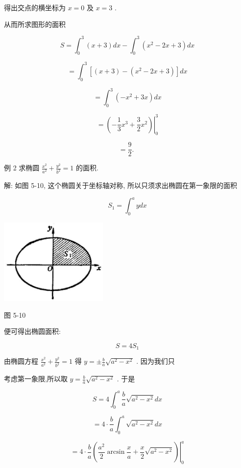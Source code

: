 \documentclass[lang=cn,newtx,10pt,scheme=chinese]{elegantbook}
\begin{document}
得出交点的横坐标为 \(x = 0\) 及 \(x = 3\) .

从而所求图形的面积

\[
S = {\int }_{0}^{3}\left( {x + 3}\right) {dx} - {\int }_{0}^{3}\left( {{x}^{2} - {2x} + 3}\right) {dx}
\]

\[
= {\int }_{0}^{3}\left\lbrack {\left( {x + 3}\right) - \left( {{x}^{2} - {2x} + 3}\right) }\right\rbrack {dx}
\]

\[
= {\int }_{0}^{3}\left( {-{x}^{2} + {3x}}\right) {dx}
\]

\[
= {\left. \left( -\frac{1}{3}{x}^{3} + \frac{3}{2}{x}^{2}\right) \right| }_{0}^{3}
\]

\[
= \frac{9}{2}\text{. }
\]

例 2 求椭圆 \(\frac{{x}^{2}}{{a}^{2}} + \frac{{y}^{2}}{{b}^{2}} = 1\) 的面积.

解: 如图 5-10, 这个椭圆关于坐标轴对称, 所以只须求出椭圆在第一象限的面积

\[
{S}_{1} = {\int }_{0}^{a}{ydx}
\]

\begin{center}
\includegraphics[max width=0.4\textwidth]{images/01912c18-5c3f-733d-b775-749ba9897a9d_233_497776.jpg}
\end{center}

图 5-10

便可得出椭圆面积:

\[
S = 4{S}_{1}
\]

由椭圆方程 \(\frac{{x}^{2}}{{a}^{2}} + \frac{{y}^{2}}{{b}^{2}} = 1\) 得 \(y = \pm \frac{b}{a}\sqrt{{a}^{2} - {x}^{2}}\) . 因为我们只

考虑第一象限,所以取 \(y = \frac{b}{a}\sqrt{{a}^{2} - {x}^{2}}\) . 于是

\[
S = 4{\int }_{0}^{a}\frac{b}{a}\sqrt{{a}^{2} - {x}^{2}}{dx}
\]

\[
= 4 \cdot \frac{b}{a}{\int }_{0}^{a}\sqrt{{a}^{2} - {x}^{2}}{dx}
\]

\[
= {\left. 4 \cdot \frac{b}{a}\left( \frac{{a}^{2}}{2}\arcsin \frac{x}{a} + \frac{x}{2}\sqrt{{a}^{2} - {x}^{2}}\right) \right| }_{0}^{a}
\]
\end{document}
